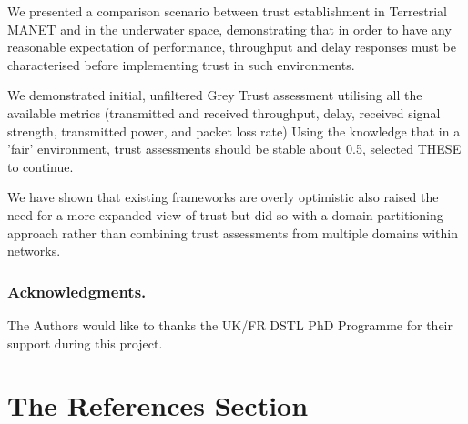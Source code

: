 \documentclass[runningheads,a4paper]{llncs}
\begin{document}
We presented a comparison scenario between trust establishment in Terrestrial MANET and in the underwater space, demonstrating that in order to have any reasonable expectation of performance, throughput and delay responses must be characterised before implementing trust in such environments. 

We demonstrated initial, unfiltered Grey Trust assessment utilising all the available metrics (transmitted and received throughput, delay, received signal strength, transmitted power, and packet loss rate)
Using the knowledge that in a 'fair' environment, trust assessments should be stable about 0.5, selected  THESE to continue. 

We have shown that existing frameworks are overly optimistic 
 \cite{Huang2010a} also raised the need for a more expanded view of trust but did so with a domain-partitioning approach rather than combining trust assessments from multiple domains within networks.

\subsubsection*{Acknowledgments.} The Authors would like to thanks the UK/FR DSTL PhD Programme for their support during this project.

\section{The References Section}\label{references}

%

% 
% 
% 
% 
% 
% 
% 
% 

\listoftodos
\end{document}
